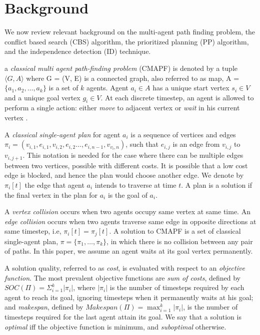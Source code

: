 \documentclass[letterpaper]{article} %
\def\
UrlFont{\rm}  %
\newcommand{\plan}[1]{\textbf{[\color{blue}PLAN:#1]}}
\theoremstyle{definition}
\begin{document}





\section{Background}

We now review relevant background on the multi-agent path finding problem, the conflict based search (CBS) algorithm, the prioritized planning (PP) algorithm, and the independence detection (ID) technique.

a \emph{classical multi agent path-finding problem} (CMAPF) is denoted by a tuple $\langle G, A \rangle$ where G = (V, E) is a connected graph, also referred to as map, A = $\{a_1, a_2, \ldots, a_k\}$ is a set of $k$ agents. Agent $a_i\in A$ has a unique start vertex $s_i \in V$ and a unique goal vertex $g_i \in V$. At each discrete timestep, an agent is allowed to perform a single action: either \emph{move} to adjacent vertex or \emph{wait} in his current vertex \cite{stern2019overiew}.

A \emph{classical single-agent plan} for agent $a_i$ is a sequence of vertices and edges $\pi_{i} = (v_{i,1}, e_{i,1}, v_{i,2},  e_{i,2} \ldots,  e_{i,n-1}, v_{v_i,n})$, such that $e_{i,j}$ is an edge from $v_{i,j}$ to $v_{i,j+1}$. This notation is needed for the case where there can be multiple edges between two vertices, possible with different costs. It is possible that a low cost edge is blocked, and hence the plan would choose another edge. We denote by $\pi_{i}[t]$ the edge that agent $a_{i}$ intends to traverse at time $t$. A plan is a solution if the final vertex in the plan for $a_i$ is the goal of $a_i$.

A \emph{vertex collision} occurs when two agents occupy same vertex at same time. An \emph{edge collision} occurs when two agents traverse same edge in opposite directions at same timestep, i.e, $\pi_{i}[t] = \pi_{j}[t]$. A solution to CMAPF is a set of classical single-agent plan, $\pi=\{\pi_1,\ldots,\pi_k\}$, in which there is no collision between any pair of paths. In this paper, we assume an agent waits at its goal vertex permanently.

A solution quality, referred to as \emph{cost}, is evaluated with respect to an \emph{objective function}. The most prevalent objective functions are \emph{sum of costs}, defined by $ SOC(\Pi)=\Sigma_{i=1}^{k} |\pi_{i}| $, where $|\pi_{i}|$ is the number of timesteps required by each agent to reach its goal, ignoring timesteps when it permanently waits at his goal; and \emph{makespan}, defined by $Makespan(\Pi)=\max_{i=1}^{k}|\pi_{i}|$, is the number of timesteps required for the last agent attain its goal. We say that a solution is \emph{optimal} iff the objective function is minimum, and \emph{suboptimal} otherwise.
\end{document}
